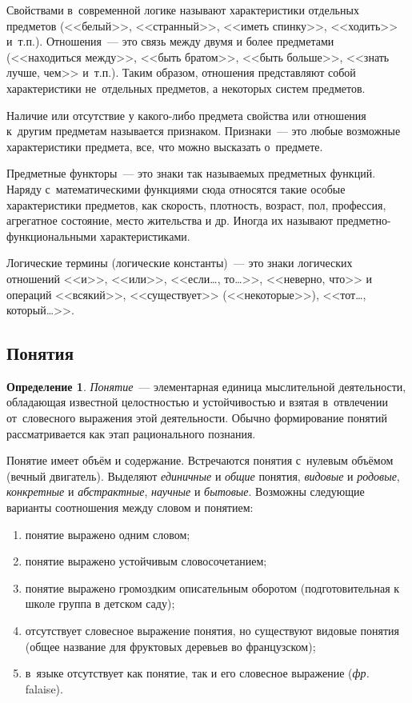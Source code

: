 \documentclass[12pt]{article}
\theoremstyle{definition}
\newtheorem*{defn}{Определение}
\theoremstyle{remark}
\numberwithin{equation}{section}
\begin{document}
Свойствами в~современной логике называют характеристики отдельных предметов
(<<белый>>, <<странный>>, <<иметь спинку>>, <<ходить>> и~т.п.).
Отношения~--- это связь между двумя и более предметами (<<находиться
между>>, <<быть братом>>, <<быть больше>>, <<знать лучше, чем>> и~т.п.).
Таким образом, отношения представляют собой характеристики не~отдельных
предметов, а некоторых систем предметов.

Наличие или отсутствие у какого-либо предмета свойства или отношения
к~другим предметам называется признаком. Признаки~--- это любые возможные
характеристики предмета, все, что можно высказать о~предмете.

Предметные функторы~--- это знаки так называемых предметных функций.
Наряду с~математическими функциями сюда относятся такие особые
характеристики предметов, как скорость, плотность, возраст, пол,
профессия, агрегатное состояние, место жительства и др.
Иногда их называют предметно-функциональными характеристиками.

Логические термины (логические константы)~--- это знаки логических
отношений <<и>>, <<или>>, <<если\dots, то\dots>>, <<неверно, что>>
и операций <<всякий>>, <<существует>> (<<некоторые>>), <<тот…, который…>>.

\subsection{Понятия}
\label{subsec:Concept}
\begin{defn}
	\textsl{Понятие}~--- элементарная единица мыслительной деятельности,
    обладающая известной целостностью и устойчивостью и взятая в~отвлечении
    от~словесного выражения этой деятельности. Обычно формирование понятий
    рассматривается как этап рационального познания.
\end{defn}
Понятие имеет объём и содержание. Встречаются понятия с~нулевым объёмом
(вечный двигатель). Выделяют \textit{единичные} и \textit{общие} понятия,
\textit{видовые} и \textit{родовые}, \textit{конкретные} и \textit{абстрактные},
\textit{научные} и \textit{бытовые}. Возможны следующие варианты соотношения
между словом и понятием:
\begin{enumerate}
    \item понятие выражено одним словом;
    \item понятие выражено устойчивым словосочетанием;
    \item понятие выражено громоздким описательным оборотом
    (подготовительная к школе группа в детском саду);
    \item отсутствует словесное выражение понятия, но существуют видовые
    понятия (общее название для фруктовых деревьев во французском);
    \item в~языке отсутствует как понятие, так и его словесное выражение
    (\textit{фр.} falaise).
\end{enumerate}
\end{document}
